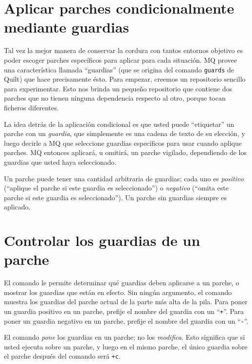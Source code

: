 \section{Aplicar parches condicionalmente mediante guardias}

Tal vez la mejor manera de conservar la cordura con tantos entornos
objetivo es poder escoger parches específicos para aplicar para cada
situación. MQ provee una característica llamada ``guardias''
(que se origina del comando \texttt{guards} de Quilt) que hace
precisamente ésto. Para empezar, creemos un repositorio sencillo para
experimentar.
Esto nos brinda un pequeño repositorio que contiene dos parches que no
tienen ninguna dependencia respecto al otro, porque tocan ficheros
diferentes.

La idea detrás de la aplicación condicional es que usted puede
``etiquetar'' un parche con un \emph{guardia}, que simplemente es una
cadena de texto de su elección, y luego decirle a MQ que seleccione
guardias específicos para usar cuando aplique parches. MQ entonces
aplicará, u omitirá, un parche vigilado, dependiendo de los guardias
que usted haya seleccionado.

Un parche puede tener una cantidad arbitraria de guardias; cada uno es
\emph{positivo} (``aplique el parche si este guardia es
seleccionado'') o \emph{negativo} (``omita este parche si este guardia
es seleccionado''). Un parche sin guardias siempre es aplicado.

\section{Controlar los guardias de un parche}

El comando  le permite determinar qué guardias
deben aplicarse a un parche, o mostrar los guardias que están en
efecto. Sin ningún argumento, el comando muestra los guardias del
parche actual de la parte más alta de la pila.
Para poner un guardia positivo en un parche, prefije el nombre del
guardia con un ``\texttt{+}''.
Para poner un guardia negativo en un parche, prefije el nombre del
guardia con un ``\texttt{-}''.

\begin{note}
  El comando  \emph{pone} los guardias en un
  parche; no los \emph{modifica}. Esto significa que si usted ejecuta
   sobre un parche, y luego
   en el mismo parche, el único guardia sobre el
  parche después del comando será \texttt{+c}.
\end{note}

